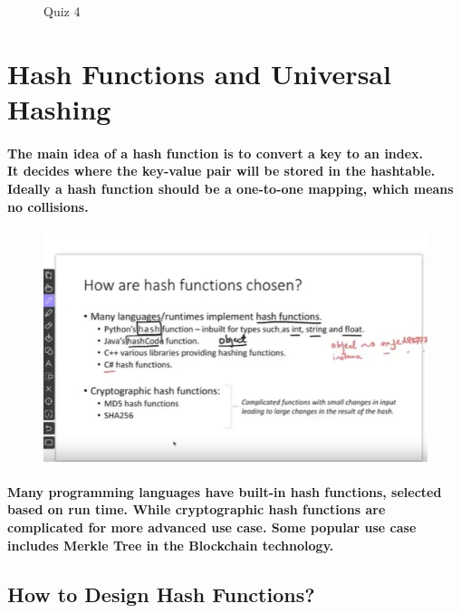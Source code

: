 \documentclass{article}
\begin{document}
\begin{figure}[H]
    \caption{Quiz 4\\}
\end{figure}


\section{Hash Functions and Universal Hashing}

\paragraph{The main idea of a hash function is to convert a key to an index.\\
It decides where the key-value pair will be stored in the hashtable.\\
Ideally a hash function should be a one-to-one mapping, which means no collisions.\\}

\begin{figure}[H]
    \includegraphics[width=\textwidth]{hashfunctionselection.png}
    
\end{figure}

\paragraph{Many programming languages have built-in hash functions, selected based on run time.
While cryptographic hash functions are complicated for more advanced use case. Some popular
use case includes Merkle Tree in the Blockchain technology.\\}

\subsection{How to Design Hash Functions?}
\end{document}
